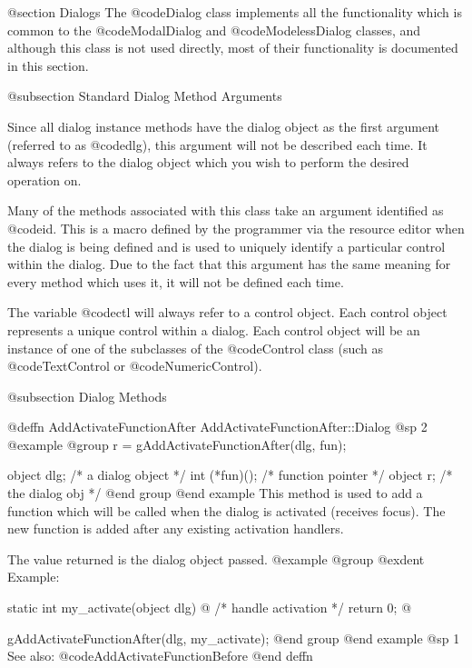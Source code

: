 @section Dialogs
The @code{Dialog} class implements all the functionality which is common
to the @code{ModalDialog} and @code{ModelessDialog} classes, and although
this class is not used directly, most of their functionality is documented
in this section.

@subsection  Standard Dialog Method Arguments

Since all dialog instance methods have the dialog object as the first
argument (referred to as @code{dlg}), this argument will not be described
each time.  It always refers to the dialog object which you wish to
perform the desired operation on.

Many of the methods associated with this class take an argument
identified as @code{id}.  This is a macro defined by the programmer via
the resource editor when the dialog is being defined and is used to
uniquely identify a particular control within the dialog.  Due to the
fact that this argument has the same meaning for every method which
uses it, it will not be defined each time.

The variable @code{ctl} will always refer to a control object.  Each
control object represents a unique control within a dialog.  Each
control object will be an instance of one of the subclasses of the
@code{Control} class (such as @code{TextControl} or
@code{NumericControl}).



@subsection Dialog Methods






@deffn {AddActivateFunctionAfter} AddActivateFunctionAfter::Dialog
@sp 2
@example
@group
r = gAddActivateFunctionAfter(dlg, fun);

object  dlg;        /*  a dialog object   */
int     (*fun)();   /*  function pointer  */
object  r;          /*  the dialog obj    */
@end group
@end example
This method is used to add a function which will be called when the dialog
is activated (receives focus).  The new function is added after any existing
activation handlers.

The value returned is the dialog object passed.
@example
@group
@exdent Example:

static int  my_activate(object dlg)
@{
        /*  handle activation  */
        return 0;
@}

gAddActivateFunctionAfter(dlg, my_activate);
@end group
@end example
@sp 1
See also:  @code{AddActivateFunctionBefore}
@end deffn




